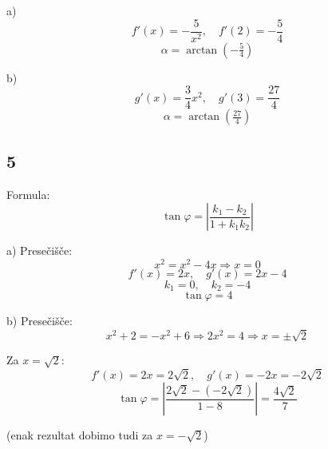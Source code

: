 \documentclass[a4paper,12pt]{article}
\begin{document}
a)
\[
f'(x)=-\frac{5}{x^2},\quad f'(2)=-\frac{5}{4}
\]
\[
\alpha=\arctan\!\left(-\tfrac{5}{4}\right)
\]

b)
\[
g'(x)=\frac{3}{4}x^2,\quad g'(3)=\frac{27}{4}
\]
\[
\alpha=\arctan\!\left(\tfrac{27}{4}\right)
\]

\subsection*{5}
Formula:
\[
\tan \varphi = \left|\frac{k_1-k_2}{1+k_1k_2}\right|
\]

a)
Presečišče:
\[
x^2=x^2-4x \Rightarrow x=0
\]
\[
f'(x)=2x,\quad g'(x)=2x-4
\]
\[
k_1=0,\quad k_2=-4
\]
\[
\tan \varphi = 4
\]

b)
Presečišče:
\[
x^2+2=-x^2+6 \Rightarrow 2x^2=4 \Rightarrow x=\pm\sqrt{2}
\]

Za $x=\sqrt{2}$:
\[
f'(x)=2x=2\sqrt{2},\quad g'(x)=-2x=-2\sqrt{2}
\]
\[
\tan \varphi = \left|\frac{2\sqrt{2}-(-2\sqrt{2})}{1-8}\right|=\frac{4\sqrt{2}}{7}
\]

(enak rezultat dobimo tudi za $x=-\sqrt{2}$)
\end{document}

